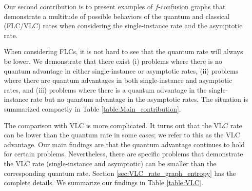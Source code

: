 \documentclass[journal, onecolumn, draftcls]{IEEEtran}
\theoremstyle{definition}
\newcommand{\meng}[1]{\marginpar{+}{\bf Ruoyu's remark}: {\em #1}}
\newcommand{\aditya}[1]{\marginpar{+}{\bf Aditya's remark}: {\em #1}}
\begin{document}
Our second contribution is to present examples of $f$-confusion graphs that demonstrate a multitude of possible behaviors of the quantum and classical (FLC/VLC) rates when considering the single-instance rate and the asymptotic rate. 
%

When considering FLCs, it is not hard to see that the quantum rate will always be lower. We demonstrate that there exist (i) problems where there is no quantum advantage in either single-instance or asymptotic rates, (ii)  problems where there are quantum advantages in both single-instance and asymptotic rates, and (iii) problems where there is a quantum advantage in the single-instance rate but no quantum advantage in the asymptotic rates. The situation is summarized compactly in Table \ref{table:Main_contribution}.


The comparison with VLC is more complicated. It turns out that the VLC rate can be lower than the quantum rate in some cases; we refer to this as the VLC advantage. Our main findings are that the quantum advantage continues to hold for certain problems. Nevertheless, there are specific problems that demonstrate the VLC rate (single-instance and asymptotic) can be smaller than the corresponding quantum rate. Section \ref{sec:VLC_rate_graph_entropy} has the complete details. We summarize our findings in Table \ref{table:VLC}.



 
\end{document}
